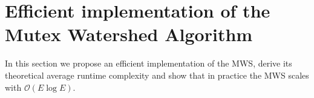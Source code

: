 

\section{Efficient implementation of the Mutex Watershed Algorithm}


In this section we propose an efficient implementation of the MWS, derive its theoretical average runtime complexity and show that in practice the MWS scales with $\mathcal{O}(E \log E)$.

